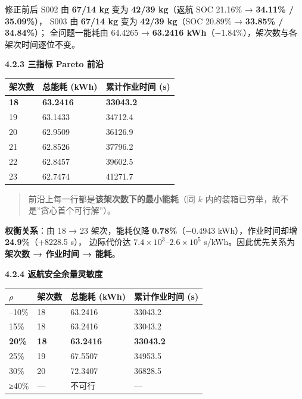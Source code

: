 \documentclass[
  10.5pt,
]{article}
\newcounter{none} %
\begin{document}
修正前后 S002 由 \textbf{67/14 kg} 变为 \textbf{42/39 kg}（返航 SOC
21.16\% → \textbf{34.11\% / 35.09\%}）， S003 由 \textbf{67/14 kg} 变为
\textbf{42/39 kg}（SOC 20.89\% → \textbf{33.85\% / 34.84\%}）；
全问题一能耗由 64.4265 → \textbf{63.2416
kWh}（−1.84\%），架次数与各架次时间逐位不变。

\textbf{4.2.3 三指标 Pareto 前沿}

{\def\LTcaptype{none} %
\begin{longtable}[]{@{}lll@{}}
\toprule\noalign{}
架次数 & 总能耗 (kWh) & 累计作业时间 (s) \\
\midrule\noalign{}
\endhead
\bottomrule\noalign{}
\endlastfoot
\textbf{18} & \textbf{63.2416} & \textbf{33043.2} \\
19 & 63.1433 & 34712.4 \\
20 & 62.9509 & 36126.9 \\
21 & 62.8526 & 37796.2 \\
22 & 62.8457 & 39602.5 \\
23 & 62.7474 & 41271.7 \\
\end{longtable}
}

\begin{quote}
前沿上每一行都是\textbf{该架次数下的最小能耗}（同 \(k\)
内的装箱已穷举，故不是''贪心首个可行解''）。
\end{quote}

\textbf{权衡关系}：由 18 → 23 架次，能耗仅降 \textbf{0.78\%}（−0.4943
kWh），作业时间却增 \textbf{24.9\%}（+8228.5 s）， 边际代价达
\(7.4\times10^3\)--\(2.6\times10^5\) s/kWh。因此优先关系为
\textbf{架次数 → 作业时间 → 能耗}。

\textbf{4.2.4 返航安全余量灵敏度}

{\def\LTcaptype{none} %
\begin{longtable}[]{@{}llll@{}}
\toprule\noalign{}
\(\rho\) & 架次数 & 总能耗 (kWh) & 累计作业时间 (s) \\
\midrule\noalign{}
\endhead
\bottomrule\noalign{}
\endlastfoot
0--10\% & 18 & 63.2416 & 33043.2 \\
15\% & 18 & 63.2416 & 33043.2 \\
\textbf{20\%} & \textbf{18} & \textbf{63.2416} & \textbf{33043.2} \\
25\% & 19 & 67.5507 & 34953.5 \\
30\% & 20 & 72.3407 & 36828.5 \\
≥40\% & --- & 不可行 & --- \\
\end{longtable}
}
\end{document}
